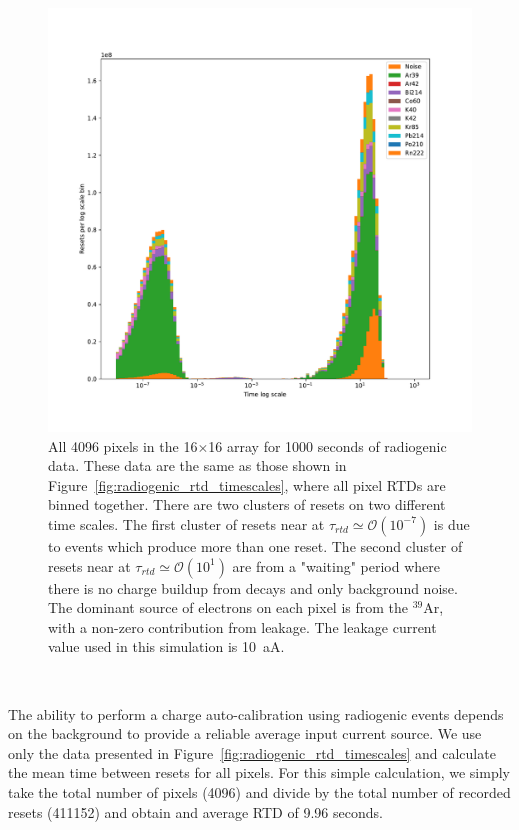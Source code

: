 \begin{figure}[]
\centering
\includegraphics[width=\textwidth]{images/radiogenicRTDtimescale_stack_1d_noise.pdf}
\caption{All 4096 pixels in the 16$\times$16 array for 1000 seconds of radiogenic data. 
These data are the same as those shown in Figure~\ref{fig:radiogenic_rtd_timescales}, where all pixel RTDs are binned together.
There are two clusters of resets on two different time scales.
The first cluster of resets near at $\tau_{rtd} \simeq \mathcal{O}(10^{-7})$ is due to events which produce more than one reset.
The second cluster of resets near at $\tau_{rtd} \simeq \mathcal{O}(10^{1})$ are from a "waiting" period where there is no charge buildup from decays and only background noise.
The dominant source of electrons on each pixel is from the $^{39}$Ar, with a non-zero contribution from leakage.
The leakage current value used in this simulation is 10~\unit{aA}.
}
\end{figure}~\label{fig:radiogenic_rtd_timescales_comparing_no_noise}

The ability to perform a charge auto-calibration using radiogenic events depends on the background to provide a reliable average input current source.
We use only the data presented in Figure~\ref{fig:radiogenic_rtd_timescales} and calculate the mean time between resets for all pixels.
For this simple calculation, we simply take the total number of pixels (4096) and divide by the total number of recorded resets (411152) and obtain and average RTD of 9.96 seconds.

